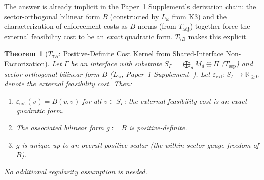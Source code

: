 \documentclass[11pt,a4paper]{article}
\newtheorem{theorem}{Theorem}[section]
\theoremstyle{definition}
\begin{document}
The answer is already implicit in the Paper~1 Supplement's derivation
chain: the sector-orthogonal bilinear form $B$ (constructed by $L_\omega$
from K3) and the characterization of enforcement costs as $B$-norms
(from $T_{\mathrm{adj}}$) together force the external feasibility cost
to be an \emph{exact} quadratic form.  $T_{7B}$ makes this explicit.

\begin{theorem}[$T_{7B}$: Positive-Definite Cost Kernel from
Shared-Interface Non-Factorization]\label{thm:T7B}
Let $\Gamma$ be an interface with substrate $S_\Gamma =
\bigoplus_d M_d \oplus \Pi$ ($T_{\mathrm{sep}}$) and sector-orthogonal
bilinear form $B$ ($L_\omega$, Paper~1 Supplement~\cite{BrookeSupplement}).
Let $\varepsilon_{\mathrm{ext}}: S_\Gamma \to \mathbb{R}_{\ge 0}$ denote
the external feasibility cost.  Then:
\begin{enumerate}[label=(\roman*),nosep]
  \item $\varepsilon_{\mathrm{ext}}(v) = B(v,v)$ for all $v \in S_\Gamma$:
        the external feasibility cost is an exact quadratic form.
  \item The associated bilinear form $g := B$ is positive-definite.
  \item $g$ is unique up to an overall positive scalar (the within-sector
        gauge freedom of $B$).
\end{enumerate}
No additional regularity assumption is needed.
\end{theorem}
\end{document}
